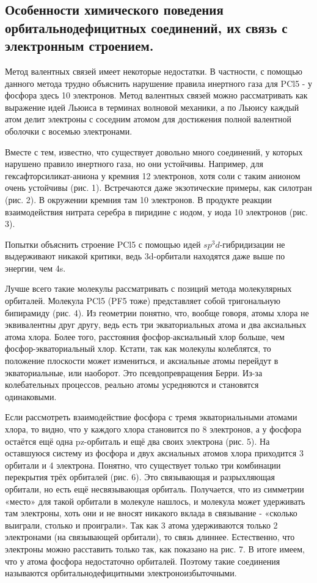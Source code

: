 
\subsection{Особенности химического поведения орбитальнодефицитных соединений, их связь с электронным строением.}

Метод валентных связей имеет некоторые недостатки. В частности, с помощью данного метода трудно объяснить нарушение правила инертного газа для PCl5 - у фосфора здесь 10
электронов. Метод валентных связей можно рассматривать как выражение идей Льюиса в терминах волновой механики, а по Льюису каждый атом делит электроны с соседним атомом для
достижения полной валентной оболочки с восемью электронами. 



Вместе с тем, известно, что существует довольно много соединений, у которых нарушено правило инертного газа, но они устойчивы. Например, для гексафторсиликат-аниона у кремния 12
электронов, хотя соли с таким анионом очень устойчивы (рис. 1). Встречаются даже экзотические примеры, как силотран (рис. 2). В окружении кремния там 10 электронов. В продукте
реакции взаимодействия нитрата серебра в пиридине с иодом, у иода 10 электронов (рис. 3).

Попытки объяснить строение PCl5 с помощью идей $sp^3d$-гибридизации не выдерживают никакой критики, ведь 3d-орбитали находятся даже выше по энергии, чем 4s. 

Лучше всего такие молекулы рассматривать с позиций метода молекулярных орбиталей. Молекула PCl5 (PF5 тоже) представляет собой тригональную бипирамиду (рис. 4). Из геометрии
понятно, что, вообще говоря, атомы хлора не эквивалентны друг другу, ведь есть три экваториальных атома и два аксиальных атома хлора. Более того, расстояния фосфор-аксиальный хлор
больше, чем фосфор-экваториальный хлор. Кстати, так как молекулы колеблятся, то положение плоскости может измениться, и аксиальные атомы перейдут в экваториальные, или
наоборот. Это псевдопревращения Берри. Из-за колебательных процессов, реально атомы усредняются и становятся одинаковыми.

Если рассмотреть взаимодействие фосфора с тремя экваториальными атомами хлора, то видно, что у каждого хлора становится по 8 электронов, а у фосфора остаётся ещё одна pz-орбиталь
и ещё два своих электрона (рис. 5). На оставшуюся систему из фосфора и двух аксиальных атомов хлора приходится 3 орбитали и 4 электрона. Понятно, что существует только три
комбинации перекрытия трёх орбиталей (рис. 6). Это связывающая и разрыхляющая орбитали, но есть ещё несвязывающая орбиталь. Получается, что из симметрии «место» для такой
орбитали в молекуле нашлось, и молекула может удерживать там электроны, хоть они и не вносят никакого вклада в связывание - «сколько выиграли, столько и проиграли». Так как 3 атома
удерживаются только 2 электронами (на связывающей орбитали), то связь длиннее. Естественно, что электроны можно расставить только так, как показано на рис. 7. В итоге имеем, что у
атома фосфора недостаточно орбиталей. Поэтому такие соединения называются орбитальнодефицитными электроноизбыточными. 

